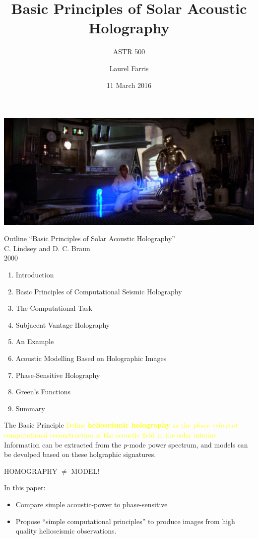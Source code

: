 \documentclass{beamer}
\title{Basic Principles of Solar Acoustic Holography}
\subtitle{ASTR 500}
\author{Laurel Farris}
\date{11 March 2016}
\begin{document}
\begin{frame}
    \titlepage{}
    \includegraphics[width=\paperwidth]{starwars.jpg}
\end{frame}

\begin{frame}{Outline}
``Basic Principles of Solar Acoustic Holography''\\
C. Lindsey and D. C. Braun\\
2000
    \begin{enumerate}
        \item Introduction
        \item Basic Principles of Computational Seismic Holography
        \item The Computational Task
        \item Subjacent Vantage Holography
        \item An Example
        \item Acoustic Modelling Based on Holographic Images
        \item Phase-Sensitive Holography
        \item Green's Functions
        \item Summary
    \end{enumerate}
\end{frame}

\begin{frame}{The Basic Principle}
    \textcolor{yellow}{Define \textbf{helioseismic holography} as the
    \emph{phase-coherent} computational
    reconstruction of the acoustic field in the solar interior.}
    Information can be extracted from the \emph{p}-mode power
    spectrum, and models can be devolped based on these holgraphic
    signatures.

    HOMOGRAPHY $\neq$ MODEL!

    In this paper:
    \begin{itemize}
        \item Compare simple acoustic-power to phase-sensitive
        \item Propose ``simple computational principles'' to produce images
            from high quality helioseismic observations.
    \end{itemize}
\end{frame}
\end{document}

